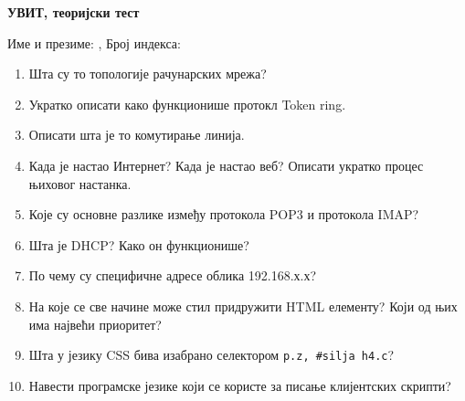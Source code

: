 \documentclass[a4paper]{article}
\begin{document}
\begin{center}
\textbf{УВИТ, теоријски тест}  
\end{center}
Име и презиме: \hrulefill, Број индекса: \hrulefill
\begin{enumerate}

\item Шта су то топологије рачунарских мрежа? 

\hrulefill

\hrulefill

\hrulefill

\item Укратко описати како функционише протокл Token ring. 

\hrulefill

\hrulefill

\hrulefill

\item Описати шта је то комутирање линија.

\hrulefill

\hrulefill

\hrulefill

\item Када је настао Интернет? Када је настао веб? Описати укратко процес њиховог настанка.

\hrulefill

\hrulefill

\hrulefill

\item Које су основне разлике између протокола POP3 и протокола IMAP?

\hrulefill

\hrulefill

\hrulefill

\item Шта је DHCP? Како он функционише?

\hrulefill

\hrulefill

\hrulefill

\item По чему су специфичне адресе облика 192.168.х.х?  

\hrulefill

\hrulefill

\hrulefill

\item На које се све начине може стил придружити HTML елементу? Који од њих има највећи приоритет?

\hrulefill

\hrulefill

\hrulefill

\item Шта у језику CSS бива изабрано селектором \verb|p.z, #silja h4.c|?

\hrulefill

\hrulefill

\hrulefill

\item Навести програмске језике који се користе за писање клијентских скрипти?

\hrulefill

\hrulefill

\hrulefill


\end{enumerate}
\end{document}
